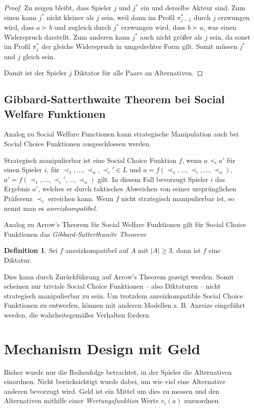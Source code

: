 \documentclass[a4paper,11pt]{article}
\theoremstyle{definition}
\newtheorem{definition}{Definition}
\theoremstyle{plain}
\theoremstyle{definition}
\begin{document}
\begin{proof}
	Zu zeigen bleibt, dass Spieler $j$ und $j^*$ ein und derselbe Akteur sind. 
	Zum einen kann $j^*$ nicht kleiner als $j$ sein, weil dann im Profil $\pi_{j-1}^*$ durch $j$ erzwungen wird, dass $a \succ b$ und zugleich durch $j^*$ erzwungen wird, dass $b \succ a$, was einen Widerspruch darstellt. 
	Zum anderen kann $j^*$ auch nicht größer als $j$ sein, da sonst im Profil $\pi_{j}^*$ der gleiche Widerspruch in umgedrehter Form gilt. Somit müssen $j^*$ und $j$ gleich sein.
	
	Damit ist der Spieler $j$ Diktator für alle Paare an Alternativen.
\end{proof}

\subsection{Gibbard-Satterthwaite Theorem bei Social Welfare Funktionen}
Analog zu Social Welfare Functionen kann strategische Manipulation auch bei Social Choice Funktionen ausgeschlossen werden.

Strategisch manipulierbar ist eine Social Choice Funktion $f$, wenn $a \prec_i a'$ 
für einen Spieler $i$, für $\prec_1, \ldots, \prec_n, \prec_i' \in L$ und 
$a = f(\prec_1, \ldots, \prec_i, \ldots, \prec_n)$, 
$a' = f(\prec_1, \ldots, \prec_i', \ldots, \prec_n)$ gilt. 
In diesem Fall bevorzugt Spieler $i$ das Ergebnis $a'$, welches er durch taktisches Abweichen von seiner ursprünglichen Präferenz $\prec_i$ erreichen kann.
Wenn $f$ nicht strategisch manipulierbar ist, so nennt man es \emph{anreizkompatibel}.

Analog zu Arrow's Theorem für Social Welfare Funktionen gilt für Social Choice Funktionen das \emph{Gibbard-Satterthwaite Theorem}:

\begin{definition}
	\label{def:GibbSatt}
	Sei $f$ anreizkompatibel auf $A$ mit $|A| \geq 3$, dann ist $f$ eine Diktatur.
\end{definition}

Dies kann durch Zurückführung auf Arrow's Theorem gezeigt werden. Somit scheinen nur triviale Social Choice Funktionen -- also Diktaturen -- nicht strategisch manipulierbar zu sein. Um trotzdem anreizkompatible Social Choice Funktionen zu entwerfen, können mit anderen Modellen {z. B.} Anreize eingeführt werden, die wahrheitsgemäßes Verhalten fördern.

\section{Mechanism Design mit Geld}
Bisher wurde nur die Reihenfolge betrachtet, in der Spieler die Alternativen einordnen. Nicht berücksichtigt wurde dabei, um wie viel eine Alternative anderen bevorzugt wird. Geld ist ein Mittel um dies zu messen und den Alternativen mithilfe einer \emph{Wertungsfunktion} Werte $v_i(a)$ zuzuordnen. 
\end{document}
